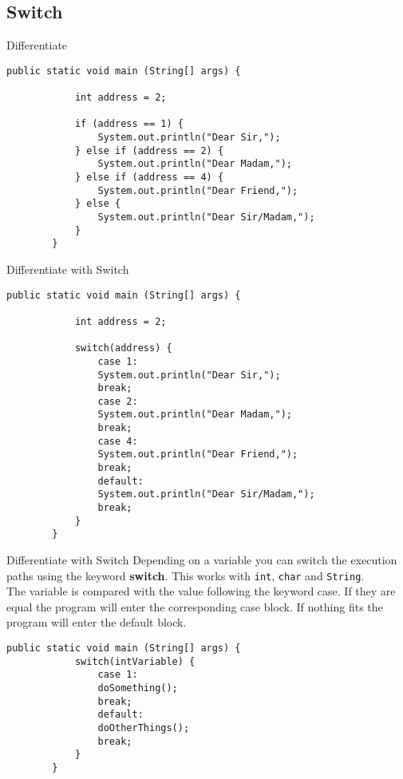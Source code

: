 \subsection{Switch}
\begin{frame}[fragile]{Differentiate}
	\begin{lstlisting}[basicstyle=\ttfamily\scriptsize]
		public static void main (String[] args) {
			
			int address = 2;
			
			if (address == 1) {
				System.out.println("Dear Sir,");	    
			} else if (address == 2) {
				System.out.println("Dear Madam,");		    
			} else if (address == 4) {
				System.out.println("Dear Friend,");		    
			} else {
				System.out.println("Dear Sir/Madam,");	
			}
		}
	\end{lstlisting}
\end{frame}
\begin{frame}[fragile]{Differentiate with Switch}
	\begin{lstlisting}[basicstyle=\ttfamily\scriptsize]
		public static void main (String[] args) {
			
			int address = 2;
			
			switch(address) {
				case 1:
				System.out.println("Dear Sir,");
				break;
				case 2:
				System.out.println("Dear Madam,");
				break;
				case 4:
				System.out.println("Dear Friend,");
				break; 
				default:
				System.out.println("Dear Sir/Madam,");
				break;
			}
		}
	\end{lstlisting}
\end{frame}
\begin{frame}[fragile]{Differentiate with Switch}
	Depending on a variable you can switch the execution paths using the keyword \textbf{switch}.
	This works with \texttt{int}, \texttt{char} and \texttt{String}. \\
	\vfill
	The variable is compared 
	with the value following the keyword case.
	If they are equal the program will enter the corresponding case block.
	If nothing fits the program will enter the default block.
	\begin{lstlisting}[basicstyle=\ttfamily\scriptsize]
		public static void main (String[] args) {
			switch(intVariable) {
				case 1:
				doSomething();
				break;
				default:
				doOtherThings();
				break;
			}
		}
	\end{lstlisting}
\end{frame}
